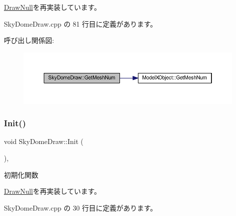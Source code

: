 \mbox{\hyperlink{class_draw_null_ad735978a85a5f3583eecd82d6bfe6413}{Draw\+Null}}を再実装しています。



 Sky\+Dome\+Draw.\+cpp の 81 行目に定義があります。

呼び出し関係図\+:\nopagebreak
\begin{figure}[H]
\begin{center}
\leavevmode
\includegraphics[width=350pt]{class_sky_dome_draw_a7ecd8d4b987e4d58a247d3438a45f9d4_cgraph}
\end{center}
\end{figure}
\mbox{\label{class_sky_dome_draw_a5b82e8b650a20dbc0b7ed720d1fb7fab}} 
\subsubsection{\texorpdfstring{Init()}{Init()}}
{\footnotesize\ttfamily void Sky\+Dome\+Draw\+::\+Init (\begin{DoxyParamCaption}{ }\end{DoxyParamCaption})\hspace{0.3cm}{\ttfamily [override]}, {\ttfamily [virtual]}}



初期化関数 



\mbox{\hyperlink{class_draw_null_acd7fef3ccea1da537ac9507ffbb6dd2e}{Draw\+Null}}を再実装しています。



 Sky\+Dome\+Draw.\+cpp の 30 行目に定義があります。

